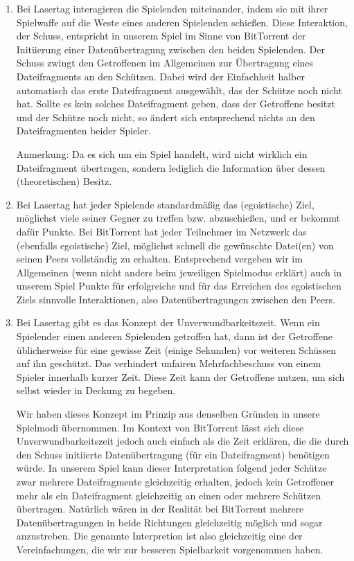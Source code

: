 \begin{enumerate}
\item Bei Lasertag interagieren die Spielenden miteinander, indem sie mit ihrer Spielwaffe auf die Weste eines anderen Spielenden schießen. Diese Interaktion, der Schuss, entspricht in unserem Spiel im Sinne von BitTorrent der Initiierung einer Datenübertragung zwischen den beiden Spielenden. Der Schuss zwingt den Getroffenen im Allgemeinen zur Übertragung eines Dateifragments an den Schützen. Dabei wird der Einfachheit halber automatisch das erste Dateifragment ausgewählt, das der Schütze noch nicht hat. Sollte es kein solches Dateifragment geben, dass der Getroffene besitzt und der Schütze noch nicht, so ändert sich entsprechend nichts an den Dateifragmenten beider Spieler.

Anmerkung: Da es sich um ein Spiel handelt, wird nicht wirklich ein Dateifragment übertragen, sondern lediglich die Information über dessen (theoretischen) Besitz.

\item Bei Lasertag hat jeder Spielende standardmäßig das (egoistische) Ziel, möglichst viele seiner Gegner zu treffen bzw. abzuschießen, und er bekommt dafür Punkte. Bei BitTorrent hat jeder Teilnehmer im Netzwerk das (ebenfalls egoistische) Ziel, möglichst schnell die gewünschte Datei(en) von seinen Peers vollständig zu erhalten. Entsprechend vergeben wir im Allgemeinen (wenn nicht anders beim jeweiligen Spielmodus erklärt) auch in unserem Spiel Punkte für erfolgreiche und für das Erreichen des egoistischen Ziels sinnvolle Interaktionen, also Datenübertragungen zwischen den Peers.

\item Bei Lasertag gibt es das Konzept der Unverwundbarkeitszeit. Wenn ein Spielender einen anderen Spielenden getroffen hat, dann ist der Getroffene üblicherweise für eine gewisse Zeit (einige Sekunden) vor weiteren Schüssen auf ihn geschützt. Das verhindert unfairen Mehrfachbeschuss von einem Spieler innerhalb kurzer Zeit. Diese Zeit kann der Getroffene nutzen, um sich selbst wieder in Deckung zu begeben.

Wir haben dieses Konzept im Prinzip aus denselben Gründen in unsere Spielmodi übernommen. Im Kontext von BitTorrent lässt sich diese Unverwundbarkeitszeit jedoch auch einfach als die Zeit erklären, die die durch den Schuss initiierte Datenübertragung (für ein Dateifragment) benötigen würde. In unserem Spiel kann dieser Interpretation folgend jeder Schütze zwar mehrere Dateifragmente gleichzeitig erhalten, jedoch kein Getroffener mehr als ein Dateifragment gleichzeitig an einen oder mehrere Schützen übertragen. Natürlich wären in der Realität bei BitTorrent mehrere Datenübertragungen in beide Richtungen gleichzeitig möglich und sogar anzustreben. Die genannte Interpretion ist also gleichzeitig eine der Vereinfachungen, die wir zur besseren Spielbarkeit vorgenommen haben.


\end{enumerate}
